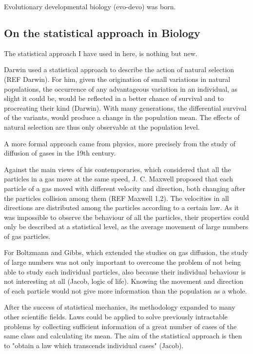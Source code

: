 Evolutionary developmental biology (evo-devo) was born.




\subsection{On the statistical approach in Biology}
The statistical approach I have used in here, is nothing but new.

Darwin used a statistical approach to describe the action of natural selection (REF Darwin). For him, given the origination of small variations in natural populations, the occurrence of any advantageous variation in an individual, as slight it could be, would be reflected in a better chance of survival and to procreating their kind (Darwin). With many generations, the differential survival of the variants, would produce a change in the population mean. 
The effects of natural selection are thus only observable at the population level.

A more formal approach came from physics, more precisely from the study of diffusion of gases in the 19th century.

Against the main views of his contemporaries, which considered that all the particles in a gas move at the same speed, J. C. Maxwell proposed that each particle of a gas moved with different velocity and direction, both changing after the particles collision among them (REF Maxwell 1,2).
The velocities in all directions are distributed among the particles according to a certain law. As it was impossible to observe the behaviour of all the particles, their properties could only be described at a statistical level, as the average movement of large numbers of gas particles.

For Boltzmann and Gibbs, which extended the studies on gas diffusion, the study of large numbers was not only important to overcome the problem of not being able to study each individual particles, also because their individual behaviour is not interesting at all (Jacob, logic of life). Knowing the movement and direction of each particle would not give more information than the population as a whole.

After the success of statistical mechanics, its methodology expanded to many other scientific fields.
Laws could be applied to solve previously intractable problems by collecting sufficient information of a great number of cases of the same class and calculating its mean. The aim of the statistical approach is then to "obtain a law which transcends individual cases" (Jacob).

